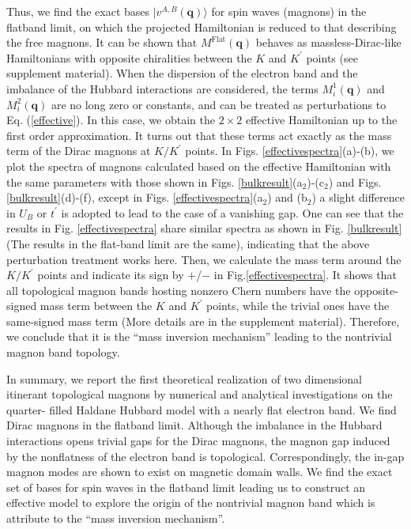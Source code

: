 \documentclass[amsmath,superscriptaddress,showpacs,aps,prl,twocolumn]{revtex4-1}
\begin{document}
Thus, we find the exact bases $|v^{A,B}(\mathbf{q})\rangle$ for spin waves (magnons) in the flatband limit, on which the projected Hamiltonian is reduced to that describing the free magnons. It can be shown that $M^\text{Flat}(\mathbf{q})$ behaves as massless-Dirac-like Hamiltonians with opposite chiralities between the $K$ and $K^\prime$ points (see supplement material). When the dispersion of the electron band and the imbalance of the Hubbard interactions are considered, the terms $M^1_i(\mathbf{q})$ and $M^2_i(\mathbf{q})$ are no long zero or constants, and can be treated as perturbations to Eq. (\ref{effective}). In this case, we obtain the $2\times 2$ effective Hamiltonian up to the first order approximation. It turns out that these terms act exactly as the mass term of the Dirac magnons at $K/K^\prime$ points. In Figs. \ref{effectivespectra}(a)-(b), we plot the spectra of magnons calculated based on the effective Hamiltonian with the same parameters with those shown in Figs. \ref{bulkresult}(a$_2$)-(c$_2$) and Figs. \ref{bulkresult}(d)-(f), except in Figs. \ref{effectivespectra}(a$_2$) and (b$_2$) a slight difference in $U_B$ or $t^{\prime}$ is adopted to lead to the case of a vanishing gap. One can see that the results in Fig. \ref{effectivespectra} share similar spectra as shown in Fig. \ref{bulkresult} (The results in the flat-band limit are the same), indicating that the above perturbation treatment works here. Then, we calculate the mass term around the $K/K^\prime$ points and indicate its sign by $+$/$-$ in Fig.\ref{effectivespectra}. It shows that all topological magnon bands hosting nonzero Chern numbers have the opposite-signed mass term between the $K$ and $K^\prime$ points, while the trivial ones have the same-signed mass term (More details are in the supplement material). Therefore, we conclude that it is the ``mass inversion mechanism'' leading to the nontrivial magnon band topology.

\par In summary, we report the first theoretical realization of two dimensional itinerant topological magnons by numerical and analytical investigations on the quarter- filled Haldane Hubbard model with a nearly flat electron band. We find Dirac magnons in the flatband limit. Although the imbalance in the Hubbard interactions opens trivial gaps for the Dirac magnons, the magnon gap induced by the nonflatness of the electron band is topological. Correspondingly, the in-gap magnon modes are shown to exist on magnetic domain walls. We find the exact set of bases for spin waves in the flatband limit leading us to construct an effective model to explore the origin of the nontrivial magnon band which is attribute to the ``mass inversion mechanism''.
\end{document}
